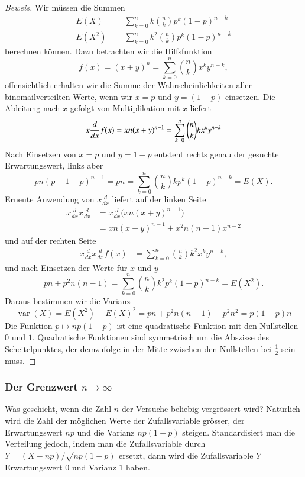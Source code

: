 \begin{proof}[Beweis] Wir müssen die Summen
\begin{align*}
E(X)&=\sum_{k=0}^nk\binom{n}{k}p^k(1-p)^{n-k}\\
E(X^2)&=\sum_{k=0}^nk^2\binom{n}{k}p^k(1-p)^{n-k}
\end{align*}
berechnen können.
Dazu betrachten wir die Hilfsfunktion
\[
f(x)=(x+y)^n=\sum_{k=0}^n\binom{n}{k}x^ky^{n-k},
\]
offensichtlich erhalten wir die Summe der Wahrscheinlichkeiten aller
binomailverteilten Werte, wenn
wir $x=p$ und $y=(1-p)$ einsetzen.
Die Ableitung nach $x$ gefolgt von Multiplikation mit $x$ liefert
\[
 x\frac{d}{dx}f(x)
=xn(x+y)^{n-1}\\
=\sum_{k=0}^n\binom{n}{k}kx^ky^{n-k}
\]
Nach Einsetzen von $x=p$ und $y=1-p$ entsteht rechts genau
der gesuchte Erwartungswert, links aber
\[
pn(p+1-p)^{n-1}=pn=\sum_{k=0}^n\binom{n}{k}kp^k(1-p)^{n-k}=E(X).
\]
Erneute Anwendung von $x\frac{d}{dx}$ liefert auf der linken Seite
\begin{align*}
x\frac{d}{dx}x\frac{d}{dx}
&=
x\frac{d}{dx}\bigl(xn(x+y)^{n-1}\bigr)
\\
&=
xn(x+y)^{n-1}+x^2 n(n-1)x^{n-2}
\end{align*}
und auf der rechten Seite
\begin{align*}
x\frac{d}{dx} x\frac{d}{dx} f(x)
&=\sum_{k=0}^n\binom{n}{k}k^2x^ky^{n-k},
\end{align*}
und nach Einsetzen der Werte für $x$ und $y$
\[
pn+p^2n(n-1)=\sum_{k=0}^n\binom{n}{k}k^2p^k(1-p)^{n-k}=E(X^2).
\]
Daraus bestimmen wir die Varianz
\[
\operatorname{var}(X)=E(X^2)-E(X)^2=pn+p^2n(n-1)-p^2n^2=p(1-p)n
\]
Die Funktion $p\mapsto np(1-p)$ ist eine quadratische Funktion mit den
Nullstellen $0$ und $1$.
Quadratische Funktionen sind symmetrisch um
die Abszisse des Scheitelpunktes, der demzufolge in der Mitte zwischen
den Nullstellen bei $\frac12$ sein muss.
\end{proof}

\subsubsection{Der Grenzwert \texorpdfstring{$n\to\infty$}{n gegen unendlich}}
Was geschieht, wenn die Zahl $n$ der Versuche beliebig vergrössert wird?
Natürlich wird die Zahl der möglichen Werte der Zufallsvariable
grösser, der Erwartungswert $np$ und die Varianz $np(1-p)$ steigen.
Standardisiert man die Verteilung jedoch, indem man die Zufallsvariable
durch $Y=(X-np)/\sqrt{np(1-p)}$ ersetzt, dann wird die Zufallsvariable $Y$
Erwartungswert $0$ und Varianz $1$ haben. 

